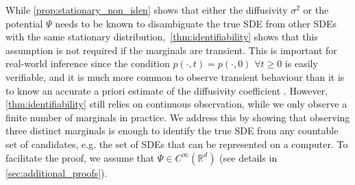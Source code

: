 \documentclass[twoside]{article}
\newcommand{\R} {\mathbb R}
\begin{document}
While \cref{prop:stationary_non_iden} shows that either the diffusivity $\sigma^2$ or the potential $\Psi$ needs to be known to disambiguate the true SDE from other SDEs with the same stationary distribution,~\cref{thm:identifiability} shows that this assumption is not required if the marginals are transient. This is important for real-world inference since the condition $p(\cdot, t)=p(\cdot, 0)$ $\forall t \ge 0$ is easily verifiable, and it is much more common to observe transient behaviour than it is to know an accurate a priori estimate of the diffusivity coefficient \citep{forrow2024consistent}. 
%
However, \cref{thm:identifiability} still relies on continuous observation, while we only observe a finite number of marginals in practice. We address this by showing that observing three distinct marginals is enough to identify the true SDE from any countable set of candidates, e.g. the set of SDEs that can be represented on a computer. To facilitate the proof, we assume that $\Psi \in C^\infty(\R^d)$ (see details in \cref{sec:additional_proofs}).


\end{document}
